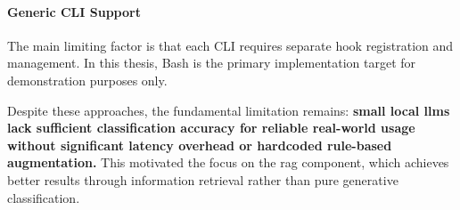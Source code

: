 %
%

\paragraph{Generic CLI Support}{}
The main limiting factor is that each CLI requires separate hook registration and
management. In this thesis, Bash is the primary implementation target for demonstration
purposes only.

%
%

Despite these approaches, the fundamental limitation remains: \textbf{small local \glspl{llm}
lack sufficient classification accuracy for reliable real-world usage without significant
latency overhead or hardcoded rule-based augmentation.} This motivated the focus on the
\gls{rag} component, which achieves better results through information retrieval rather
than pure generative classification.

